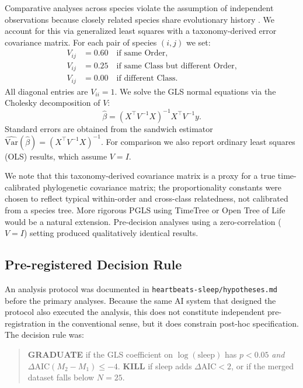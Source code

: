 \documentclass{article}
\begin{document}
Comparative analyses across species violate the assumption of independent observations
because closely related species share evolutionary history \citep{felsenstein1985}.
We account for this via generalized least squares with a taxonomy-derived error
covariance matrix. For each pair of species $(i, j)$ we set:
\begin{align*}
  V_{ij} &= 0.60 \quad \text{if same Order,} \\
  V_{ij} &= 0.25 \quad \text{if same Class but different Order,} \\
  V_{ij} &= 0.00 \quad \text{if different Class.}
\end{align*}
All diagonal entries are $V_{ii} = 1$. We solve the GLS normal equations via the
Cholesky decomposition of $V$:
\begin{equation}
  \hat{\beta} = (X^\top V^{-1} X)^{-1} X^\top V^{-1} y.
\end{equation}
Standard errors are obtained from the sandwich estimator $\widehat{\text{Var}}(\hat\beta)
= (X^\top V^{-1} X)^{-1}$. For comparison we also report ordinary least squares (OLS)
results, which assume $V = I$.

We note that this taxonomy-derived covariance matrix is a proxy for a true
time-calibrated phylogenetic covariance matrix; the proportionality constants were
chosen to reflect typical within-order and cross-class relatedness, not calibrated from
a species tree. More rigorous PGLS using TimeTree or Open Tree of Life would be a
natural extension. Pre-decision analyses using a zero-correlation ($V = I$) setting
produced qualitatively identical results.

\subsection{Pre-registered Decision Rule}
\label{sec:prereg}

An analysis protocol was documented in \texttt{heartbeats-sleep/hypotheses.md} before
the primary analyses. Because the same AI system that designed the protocol also executed
the analysis, this does not constitute independent pre-registration in the conventional
sense, but it does constrain post-hoc specification. The decision rule was:

\begin{quote}
  \textbf{GRADUATE} if the GLS coefficient on $\log(\text{sleep})$ has $p < 0.05$
  \emph{and} $\Delta\text{AIC}(M_2 - M_1) \leq -4$.
  \textbf{KILL} if sleep adds $\Delta\text{AIC} < 2$, or if the merged dataset falls
  below $N = 25$.
\end{quote}
\end{document}
